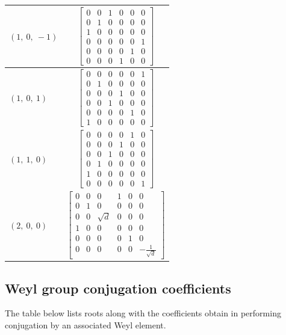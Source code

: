 \documentclass[11pt]{article}
\theoremstyle{definition}
\begin{document}
\begin{longtable}{|l|c|}
    \hline
    $\left( 1, \  0, \  -1\right)$ & ${\left[\begin{matrix}0 & 0 & 1 & 0 & 0 & 0\\0 & 1 & 0 & 0 & 0 & 0\\1 & 0 & 0 & 0 & 0 & 0\\0 & 0 & 0 & 0 & 0 & 1\\0 & 0 & 0 & 0 & 1 & 0\\0 & 0 & 0 & 1 & 0 & 0\end{matrix}\right]}$ \\
    \hline
    $\left( 1, \  0, \  1\right)$ & ${\left[\begin{matrix}0 & 0 & 0 & 0 & 0 & 1\\0 & 1 & 0 & 0 & 0 & 0\\0 & 0 & 0 & 1 & 0 & 0\\0 & 0 & 1 & 0 & 0 & 0\\0 & 0 & 0 & 0 & 1 & 0\\1 & 0 & 0 & 0 & 0 & 0\end{matrix}\right]}$ \\
    \hline
    $\left( 1, \  1, \  0\right)$ & ${\left[\begin{matrix}0 & 0 & 0 & 0 & 1 & 0\\0 & 0 & 0 & 1 & 0 & 0\\0 & 0 & 1 & 0 & 0 & 0\\0 & 1 & 0 & 0 & 0 & 0\\1 & 0 & 0 & 0 & 0 & 0\\0 & 0 & 0 & 0 & 0 & 1\end{matrix}\right]}$ \\
    \hline
    $\left( 2, \  0, \  0\right)$ & ${\left[\begin{matrix}0 & 0 & 0 & 1 & 0 & 0\\0 & 1 & 0 & 0 & 0 & 0\\0 & 0 & \sqrt{d} & 0 & 0 & 0\\1 & 0 & 0 & 0 & 0 & 0\\0 & 0 & 0 & 0 & 1 & 0\\0 & 0 & 0 & 0 & 0 & - \frac{1}{\sqrt{d}}\end{matrix}\right]}$ \\
    \hline
\end{longtable}


\subsection{Weyl group conjugation coefficients}

The table below lists roots along with the coefficients obtain in performing conjugation by an associated Weyl element.
\end{document}
